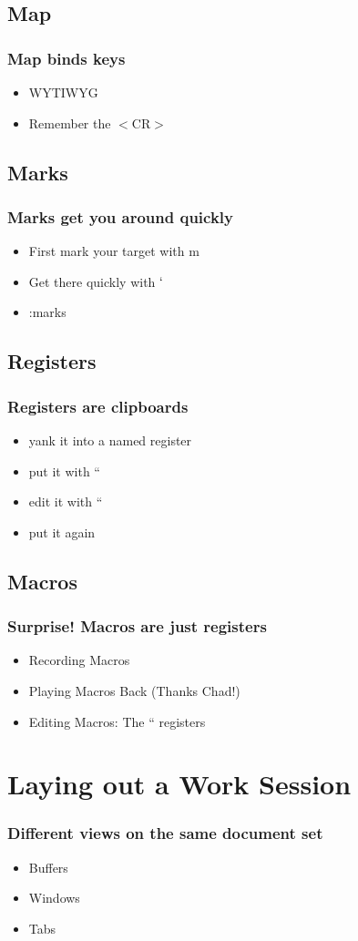 \documentclass{beamer}
\begin{document}
\subsection{Map}
\frame
{
    \frametitle{Map binds keys}

    \begin{itemize}
        \item WYTIWYG
        \item Remember the $<$CR$>$
    \end{itemize}
}
\subsection{Marks}
\frame
{
    \frametitle{Marks get you around quickly}

    \begin{itemize}
        \item First mark your target with m
        \item Get there quickly with $`$
        \item :marks
    \end{itemize}
}
\subsection{Registers}
\frame
{
    \frametitle{Registers are clipboards}

    \begin{itemize}
        \item yank it into a named register
        \item put it with ``
        \item edit it with ``
        \item put it again
    \end{itemize}
}

\subsection{Macros}
\frame
{
    \frametitle{Surprise! Macros are just registers}

    \begin{itemize}
        \item Recording Macros
        \item Playing Macros Back (Thanks Chad!)
        \item Editing Macros: The `` registers
    \end{itemize}
}

\section{Laying out a Work Session}
\frame
{
    \frametitle{Different views on the same document set}

    \begin{itemize}
        \item Buffers
        \item Windows
        \item Tabs
    \end{itemize}
}
\end{document}
